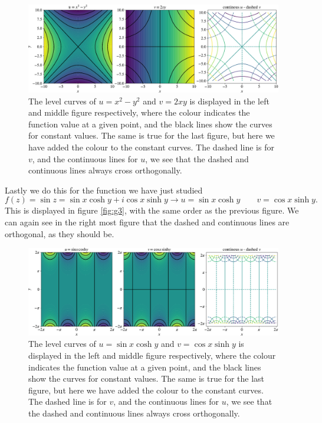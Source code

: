 \documentclass[12pt,twoside]{article}
\begin{document}
\begin{figure}
  \centering
  \includegraphics[width=\textwidth]{../figures/secound.pdf}
  \caption{The level curves of $u=x^2-y^2$ and $v=2xy$ is displayed in the left and middle figure respectively, where the colour indicates the function value at a given point, and the black lines show the curves for constant values. The same is true for the last figure, but here we have added the colour to the constant curves. The dashed line is for $v$, and the continuous lines for $u$, we see that the dashed and continuous lines always cross orthogonally.}
  \label{fig:g2}
\end{figure}
Lastly we do this for the function we have just studied
\begin{equation}
  f(z) = \sin{z} = \sin{x}\cosh{y}+i\cos{x}\sinh{y} \rightarrow u=\sin{x}\cosh{y}\qquad v=\cos{x}\sinh{y}.
\end{equation}
This is displayed in figure \vref{fig:g3}, with the same order as the previous figure. We can again see in the right most figure that the dashed and continuous lines are orthogonal, as they should be.\par
\begin{figure}
  \centering
  \includegraphics[width=\textwidth]{../figures/third.pdf}
  \caption{The level curves of $u=\sin{x}\cosh{y}$ and $v=\cos{x}\sinh{y}$ is displayed in the left and middle figure respectively, where the colour indicates the function value at a given point, and the black lines show the curves for constant values. The same is true for the last figure, but here we have added the colour to the constant curves. The dashed line is for $v$, and the continuous lines for $u$, we see that the dashed and continuous lines always cross orthogonally.}
  \label{fig:g3}
\end{figure}
\end{document}
